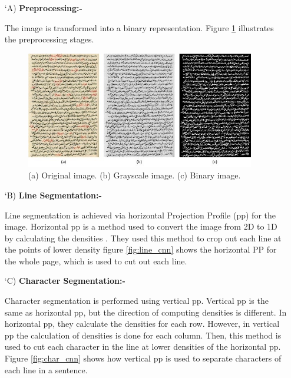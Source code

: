 \begin{itemize}[labelindent=1em,labelsep=0.25cm,leftmargin=*]
        \item[\char `A)] \textbf{Preprocessing:-}
        
        The image is transformed into a binary representation. Figure \ref{fig:pre_cnn} illustrates the preprocessing stages.
        
        \begin{figure}[!htb]
            \centering
            \includegraphics[width=10cm]{images/pre_cnn.png}
            \caption{(a) Original image. (b) Grayscale image. (c) Binary image.}
            \label{fig:pre_cnn}
        \end{figure}
        
        \item[\char `B)] \textbf{Line Segmentation:-} 
        
        Line segmentation is achieved via horizontal Projection Profile (\acrshort{pp}) for the image. Horizontal \acrshort{pp} is a method used to convert the image from 2D to 1D by calculating the densities \cite{PP}. They used this method to crop out each line at the points of lower density figure \ref{fig:line_cnn} shows the horizontal PP for the whole page, which is used to cut out each line.
        
        \item[\char `C)] \textbf{Character Segmentation:-} 
        
        Character segmentation is performed using vertical \acrshort{pp}. Vertical \acrshort{pp} is the same as horizontal \acrshort{pp}, but the direction of computing densities is different. In horizontal \acrshort{pp}, they calculate the densities for each row. However, in vertical \acrshort{pp} the calculation of densities is done for each column. Then, this method is used to cut each character in the line at lower densities of the horizontal \acrshort{pp}. Figure \ref{fig:char_cnn} shows how vertical \acrshort{pp} is used to  separate characters of each line in a sentence.
        

\end{itemize}
